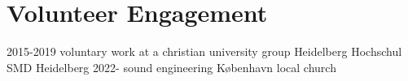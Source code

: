 \documentclass[]{friggeri-cv}
\begin{document}
\section{Volunteer Engagement}
\begin{entrylist}
  \entry
    {2015-2019}
    {voluntary work at a christian university group}
    {Heidelberg}
    {Hochschul SMD Heidelberg}
  \entry
    {2022-}
    {sound engineering}
    {K{\o}benhavn}
    {local church}    
\end{entrylist}


%
%
\end{document}

